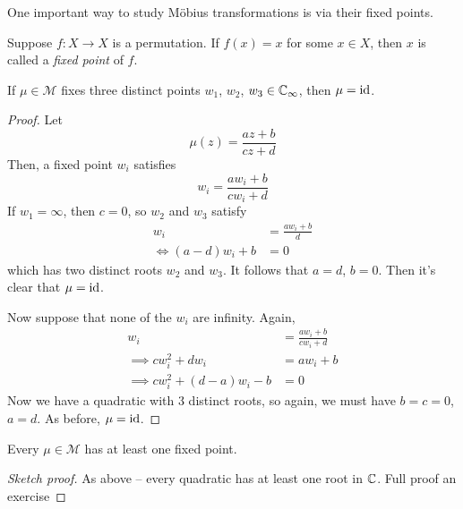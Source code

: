 \documentclass{../../template/note}
\begin{document}
    One important way to study M\"obius transformations is via their fixed points.

    \begin{definition}
        Suppose \(f: X \to X\) is a permutation. If \(f(x) = x\) for some \(x \in X\), then \(x\) is called a \emph{fixed point} of \(f\).
    \end{definition}
    
    \begin{lemma}
        If \(\mu \in \mathcal M\) fixes three distinct points \(w_1\), \(w_2\), \(w_3 \in \mathbb C_\infty\), then \(\mu = \operatorname{id}\).
    \end{lemma}
    
    \begin{proof}
        Let
        \[
            \mu(z) = \frac{az+b}{cz+d}
        \]
        Then, a fixed point \(w_i\) satisfies
        \[
            w_i = \frac{aw_i + b}{cw_i + d}
        \]
        If \(w_1 = \infty\), then \(c = 0\), so \(w_2\) and \(w_3\) satisfy
        \begin{align*}
            w_i &= \frac{aw_i + b}{d} \\
            \iff (a-d)w_i + b &= 0
        \end{align*}
        which has two distinct roots \(w_2\) and \(w_3\). It follows that \(a = d\), \(b = 0\). Then it's clear that \(\mu = \operatorname{id}\).

        Now suppose that none of the \(w_i\) are infinity. Again,
        \begin{align*}
            w_i &= \frac{aw_i + b}{cw_i + d} \\
            \implies cw_i^2 + dw_i &= aw_i + b \\
            \implies cw_i^2 + (d-a)w_i - b &= 0
        \end{align*}
        Now we have a quadratic with 3 distinct roots, so again, we must have \(b = c = 0\), \(a = d\). As before, \(\mu = \operatorname{id}\).
    \end{proof}
    
    \begin{proposition}
        Every \(\mu \in \mathcal M\) has at least one fixed point.
    \end{proposition}

    \begin{proof}[Sketch proof]
        As above -- every quadratic has at least one root in \(\mathbb C\). Full proof an exercise
    \end{proof}
    
\end{document}
